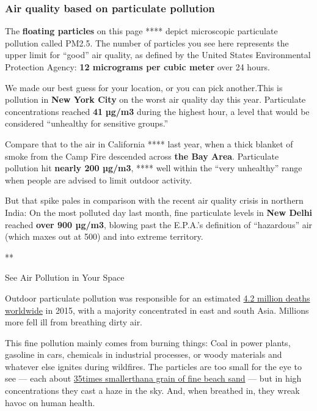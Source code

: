 \hypertarget{air-quality-based-on-particulate-pollution}{%
\subsubsection{Air quality based on particulate
pollution}\label{air-quality-based-on-particulate-pollution}}

The \textbf{floating particles} on this page **** depict microscopic
particulate pollution called PM2.5. The number of particles you see here
represents the upper limit for ``good'' air quality, as defined by the
United States Environmental Protection Agency: \textbf{12 micrograms per
cubic meter} over 24 hours.

We made our best guess for your location, or you can pick another.This
is pollution in \textbf{New York City} on the worst air quality day this
year. Particulate concentrations reached \textbf{41} \textbf{µg/m3}
during the highest hour, a level that would be considered ``unhealthy
for sensitive groups.''

Compare that to the air in California **** last year, when a thick
blanket of smoke from the Camp Fire descended across \textbf{the Bay
Area}. Particulate pollution hit \textbf{nearly 200 µg/m3}, **** well
within the ``very unhealthy'' range when people are advised to limit
outdoor activity.

But that spike pales in comparison with the recent air quality crisis in
northern India: On the most polluted day last month, fine particulate
levels in \textbf{New Delhi} reached \textbf{over 900 µg/m3}, blowing
past the E.P.A.'s definition of ``hazardous'' air (which maxes out at
500) and into extreme territory.

**

See Air Pollution in Your Space

Outdoor particulate pollution was responsible for an estimated
\href{https://www.thelancet.com/journals/lancet/article/PIIS0140-6736(17)30505-6/fulltext}{4.2
million deaths worldwide} in 2015, with a majority concentrated in east
and south Asia. Millions more fell ill from breathing dirty air.

This fine pollution mainly comes from burning things: Coal in power
plants, gasoline in cars, chemicals in industrial processes, or woody
materials and whatever else ignites during wildfires. The particles are
too small for the eye to see --- each about
\href{https://www.epa.gov/pm-pollution/particulate-matter-pm-basics}{35}\href{https://www.epa.gov/pm-pollution/particulate-matter-pm-basics}{times
smaller}\href{https://www.epa.gov/pm-pollution/particulate-matter-pm-basics}{than}\href{https://www.epa.gov/pm-pollution/particulate-matter-pm-basics}{a
grain of fine beach sand} --- but in high concentrations they cast a
haze in the sky. And, when breathed in, they wreak havoc on human
health.

